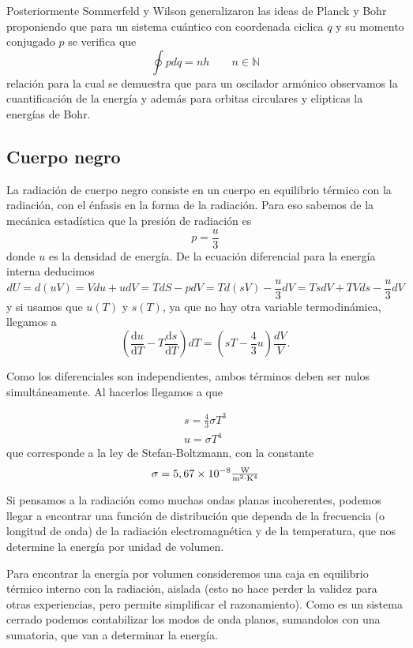 Posteriormente Sommerfeld y Wilson generalizaron las ideas de Planck y Bohr proponiendo que para un sistema cuántico con coordenada ciclica $q$ y su momento conjugado $p$ se verifica que
\begin{equation}
    \oint p dq = n h \qquad n \in \mathbb{N}
\end{equation}
relación para la cual se demuestra que para un oscilador armónico observamos la cuantificación de la energía y además para orbitas circulares y elipticas la energías de Bohr.

\subsection{Cuerpo negro}
La radiación de cuerpo negro consiste en un cuerpo en equilibrio térmico con la radiación, con el énfasis en la forma de la radiación.
Para eso sabemos de la mecánica estadística que la presión de radiación es
\[ p = \frac{u}{3} \]
donde $u$ es la densidad de energía. De la ecuación diferencial para la energía interna deducimos
\[dU = d(u V) = V du + u dV = T dS - p dV = T d(s V) - \frac{u}{3} dV = T s dV + T V ds - \frac{u}{3} dV\]
y si usamos que $u(T)$ y $s(T)$, ya que no hay otra variable termodinámica, llegamos a
\[ \left( \frac{\mathrm{d} u}{\mathrm{d} T} - T \frac{\mathrm{d} s}{\mathrm{d} T} \right) dT = \left(s T - \frac{4}{3} u \right) \frac{dV}{V}.\]

Como los diferenciales son independientes, ambos términos deben ser nulos simultáneamente. 
Al hacerlos llegamos a que

\begin{equation}
\begin{gathered}
 s = \frac{4}{3} \sigma T^3\\
 u = \sigma T^4
\end{gathered}
\end{equation}
que corresponde a la ley de Stefan-Boltzmann, con la constante 
\begin{equation}
\sigma = 5,67\times 10^{-8} \rm\textstyle \frac{W}{m^2 \cdot K^4} 
\end{equation}

Si pensamos a la radiación como muchas ondas planas incoherentes, podemos llegar a encontrar una función de distribución que dependa de la frecuencia (o longitud de onda) de la radiación electromagnética y de la temperatura, que nos determine la energía por unidad de volumen.

Para encontrar la energía por volumen consideremos una caja en equilibrio térmico interno con la radiación, aislada (esto no hace perder la validez para otras experiencias, pero permite simplificar el razonamiento).
Como es un sistema cerrado podemos contabilizar los modos de onda planos, sumandolos con una sumatoria, que van a determinar la energía.

